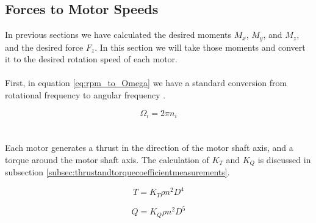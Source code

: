 \documentclass{article}
\numberwithin{equation}{section} %
\begin{document}
\subsection{Forces to Motor Speeds} \label{subsec:forcestomotorspeeds}
In previous sections we have calculated the desired moments $M_x$, $M_y$, and $M_z$, and the desired force $F_z$. In this section we will take those moments and convert it to the desired rotation speed of each motor.
\\ \\
First, in equation \eqref{eq:rpm_to_Omega} we have a standard conversion from rotational frequency to angular frequency .
 
\begin{equation} \label{eq:rpm_to_Omega}
\Omega_i = 2 \pi n_i
\end{equation}
\\ \\
Each motor generates a thrust in the direction of the motor shaft axis, and a torque around the motor shaft axis. The calculation of $K_T$ and $K_Q$ is discussed in subsection \ref{subsec:thrustandtorquecoefficientmeasurements}.


\begin{equation} \label{eq:motor_thrust}
T = K_T\rho n^2 D^4
\end{equation}

\begin{equation} \label{eq:motor_torque}
Q = K_Q\rho n^2 D^5
\end{equation}

%
\end{document}
